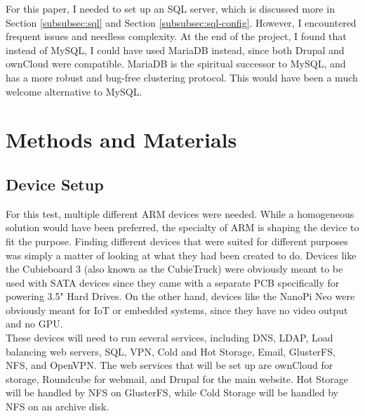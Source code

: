 \documentclass[12pt]{spieman}  %
\begin{document}
For this paper, I needed to set up an SQL server, which is discussed more in Section \ref{subsubsec:sql} and Section \ref{subsubsec:sql-config}. However, I encountered frequent issues and needless complexity. At the end of the project, I found that instead of MySQL, I could have used MariaDB instead, since both Drupal and ownCloud were compatible. MariaDB is the spiritual successor to MySQL, and has a more robust and bug-free clustering protocol\cite{hullsql}. This would have been a much welcome alternative to MySQL.

\section{Methods and Materials}
\label{sec:met-mat}
\subsection{Device Setup}
\label{subsec:dev-setup}
For this test, multiple different ARM devices were needed. While a homogeneous solution would have been preferred, the specialty of ARM is shaping the device to fit the purpose. Finding different devices that were suited for different purposes was simply a matter of looking at what they had been created to do. Devices like the Cubieboard 3 (also known as the CubieTruck) were obviously meant to be used with SATA devices since they came with a separate PCB specifically for powering 3.5" Hard Drives. On the other hand, devices like the NanoPi Neo were obviously
meant for IoT or embedded systems, since they have no video output and no GPU.\\

These devices will need to run several services, including DNS, LDAP, Load balancing web servers, SQL, VPN, Cold and Hot Storage, Email, GlusterFS, NFS, and OpenVPN. The web services that will be set up are ownCloud for storage, Roundcube for webmail, and Drupal for the main website. Hot Storage will be handled by NFS on GlusterFS, while Cold Storage will be handled by NFS on an archive disk.\\
\end{document}
